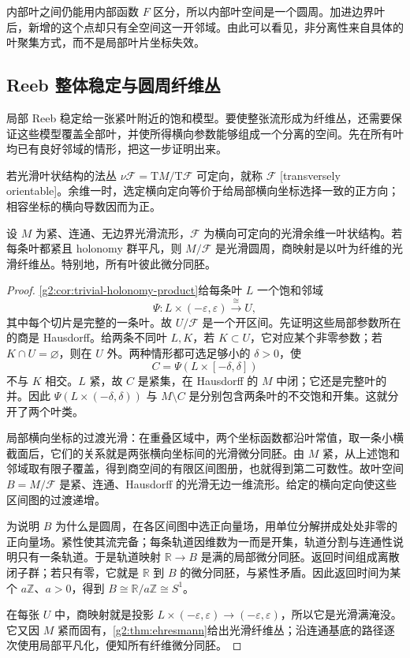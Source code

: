 内部叶之间仍能用内部函数 \(F\) 区分，所以内部叶空间是一个圆周。加进边界叶后，新增的这个点却只有全空间这一开邻域。由此可以看见，非分离性来自具体的叶聚集方式，而不是局部叶片坐标失效。

\subsection{Reeb 整体稳定与圆周纤维丛}
\label{g2:subsec:D02:03}

局部 Reeb 稳定给一张紧叶附近的饱和模型。要使整张流形成为纤维丛，还需要保证这些模型覆盖全部叶，并使所得横向参数能够组成一个分离的空间。先在所有叶均已有良好邻域的情形，把这一步证明出来。

\begin{definition}\label{g2:def:transverse-orientation}
	若光滑叶状结构的法丛 \(\nu\mathcal F=\mathrm TM/\mathrm T\mathcal F\) 可定向，就称 \(\mathcal F\) [transversely orientable]。余维一时，选定横向定向等价于给局部横向坐标选择一致的正方向；相容坐标的横向导数因而为正。
\end{definition}

\begin{theorem}\label{g2:thm:compact-trivial-holonomy-fibration}
	设 \(M\) 为紧、连通、无边界光滑流形，\(\mathcal F\) 为横向可定向的光滑余维一叶状结构。若每条叶都紧且 holonomy 群平凡，则 \(M/\mathcal F\) 是光滑圆周，商映射是以叶为纤维的光滑纤维丛。特别地，所有叶彼此微分同胚。
\end{theorem}
\begin{proof}
	\cref{g2:cor:trivial-holonomy-product}给每条叶 \(L\) 一个饱和邻域
	\[
		\Psi:L\times(-\varepsilon,\varepsilon)\xrightarrow{\;\cong\;}U,
	\]
	其中每个切片是完整的一条叶。故 \(U/\mathcal F\) 是一个开区间。先证明这些局部参数所在的商是 Hausdorff。给两条不同叶 \(L,K\)，若 \(K\subset U\)，它对应某个非零参数；若 \(K\cap U=\varnothing\)，则在 \(U\) 外。两种情形都可选足够小的 \(\delta>0\)，使
	\[
		C=\Psi(L\times[-\delta,\delta])
	\]
	不与 \(K\) 相交。\(L\) 紧，故 \(C\) 是紧集，在 Hausdorff 的 \(M\) 中闭；它还是完整叶的并。因此 \(\Psi(L\times(-\delta,\delta))\) 与 \(M\setminus C\) 是分别包含两条叶的不交饱和开集。这就分开了两个叶类。

	局部横向坐标的过渡光滑：在重叠区域中，两个坐标函数都沿叶常值，取一条小横截面后，它们的关系就是两张横向坐标间的光滑微分同胚。由 \(M\) 紧，从上述饱和邻域取有限子覆盖，得到商空间的有限区间图册，也就得到第二可数性。故叶空间 \(B=M/\mathcal F\) 是紧、连通、Hausdorff 的光滑无边一维流形。给定的横向定向使这些区间图的过渡递增。

	为说明 \(B\) 为什么是圆周，在各区间图中选正向量场，用单位分解拼成处处非零的正向量场。紧性使其流完备；每条轨道因维数为一而是开集，轨道分割与连通性说明只有一条轨道。于是轨道映射 \(\mathbb R\to B\) 是满的局部微分同胚。返回时间组成离散闭子群；若只有零，它就是 \(\mathbb R\) 到 \(B\) 的微分同胚，与紧性矛盾。因此返回时间为某个 \(a\mathbb Z\)、\(a>0\)，得到 \(B\cong\mathbb R/a\mathbb Z\cong S^1\)。

	在每张 \(U\) 中，商映射就是投影 \(L\times(-\varepsilon,\varepsilon)\to(-\varepsilon,\varepsilon)\)，所以它是光滑满淹没。它又因 \(M\) 紧而固有，\cref{g2:thm:ehresmann}给出光滑纤维丛；沿连通基底的路径逐次使用局部平凡化，便知所有纤维微分同胚。
\end{proof}

